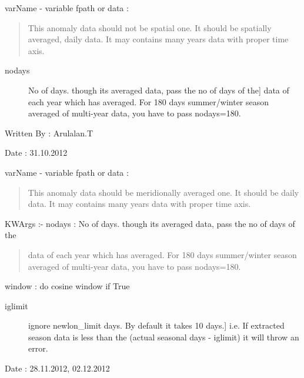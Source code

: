 \documentclass[letterpaper,10pt,english]{sphinxmanual}
\begin{document}

\begin{fulllineitems}
\label{mjo:psutils.powerSpectrum}
varName - variable
fpath or data :
\begin{quote}

This anomaly data should not be spatial one. It should be spatially
averaged, daily data.
It may contains many years data with proper time axis.
\end{quote}
\begin{description}
\item[{nodays}] \leavevmode{[}No of days. though its averaged data, pass the no of days of the{]}
data of each year which has averaged.
For 180 days summer/winter season averaged of multi-year data,
you have to pass nodays=180.

\end{description}

Written By : Arulalan.T

Date : 31.10.2012

\end{fulllineitems}


\begin{fulllineitems}
\label{mjo:psutils.waveNumber}
varName - variable
fpath or data :
\begin{quote}

This anomaly data should be meridionally averaged one.
It should be daily data.
It may contains many years data with proper time axis.
\end{quote}

KWArgs :-
nodays : No of days. though its averaged data, pass the no of days of the
\begin{quote}

data of each year which has averaged.
For 180 days summer/winter season averaged of multi-year data,
you have to pass nodays=180.
\end{quote}

window : do cosine window if True
\begin{description}
\item[{iglimit}] \leavevmode{[}ignore newlon\_limit days. By default it takes 10 days.{]}
i.e. If extracted season data is less than the (actual seasonal
days - iglimit) it will throw an error.

\end{description}

Date : 28.11.2012, 02.12.2012

\end{fulllineitems}
\end{document}
